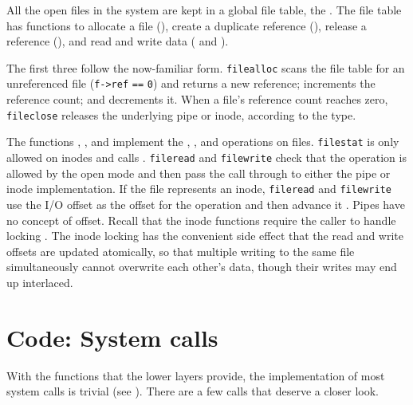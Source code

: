 All the open files in the system are kept in a global file table,
the 
.
The file table
has functions to allocate a file
(),
create a duplicate reference
(),
release a reference
(),
and read and write data
(
and 
).

The first three follow the now-familiar form.
\lstinline{filealloc}
scans the file table for an unreferenced file
(\lstinline{f->ref}
\lstinline{==}
\lstinline{0})
and returns a new reference;
increments the reference count;
and
decrements it.
When a file's reference count reaches zero,
\lstinline{fileclose}
releases the underlying pipe or inode,
according to the type.

The functions
,
,
and
implement the 
,
,
and
operations on files.
\lstinline{filestat}
is only allowed on inodes and calls
.
\lstinline{fileread}
and
\lstinline{filewrite}
check that the operation is allowed by
the open mode and then
pass the call through to either
the pipe or inode implementation.
If the file represents an inode,
\lstinline{fileread}
and
\lstinline{filewrite}
use the I/O offset as the offset for the operation
and then advance it
.
Pipes have no concept of offset.
Recall that the inode functions require the caller
to handle locking
.
The inode locking has the convenient side effect that the
read and write offsets are updated atomically, so that
multiple writing to the same file simultaneously
cannot overwrite each other's data, though their writes may end up interlaced.
\section{Code: System calls}

With the functions that the lower layers provide, the implementation of most
system calls is trivial
(see
).
There are a few calls that
deserve a closer look.

